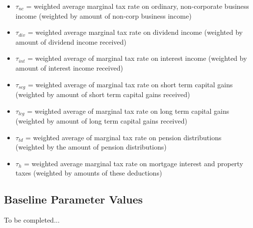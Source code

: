 \documentclass[article,11pt,letterpaper,fleqn]{article}
\theoremstyle{definition}
\numberwithin{equation}{section}
\begin{document}
\begin{itemize}
\item $\tau_{nc}$ = weighted average marginal tax rate on ordinary, non-corporate business income (weighted by amount of non-corp business income)
\item $\tau_{div}$ = weighted average marginal tax rate on dividend income (weighted by amount of dividend income received)
\item $\tau_{int}$ = weighted average of marginal tax rate on interest income (weighted by amount of interest income received)
\item $\tau_{scg}$ = weighted average of marginal tax rate on short term capital gains (weighted by amount of short term capital gains received)
\item $\tau_{lcg}$ = weighted average of marginal tax rate on long term capital gains (weighted by amount of long term capital gains received)
\item $\tau_{td}$ = weighted average of marginal tax rate on pension distributions (weighted by the amount of pension distributions)
\item $\tau_{h}$ = weighted average marginal tax rate on mortgage interest and property taxes (weighted by amounts of these deductions)
\end{itemize}


\subsection{Baseline Parameter Values}

To be completed...


\end{document}

